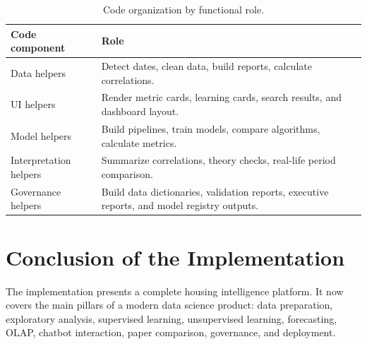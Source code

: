 \begin{table}[H]
\centering
\begin{tabularx}{\textwidth}{lX}
\toprule
\textbf{Code component} & \textbf{Role} \\
\midrule
Data helpers & Detect dates, clean data, build reports, calculate correlations. \\
UI helpers & Render metric cards, learning cards, search results, and dashboard layout. \\
Model helpers & Build pipelines, train models, compare algorithms, calculate metrics. \\
Interpretation helpers & Summarize correlations, theory checks, real-life period comparison. \\
Governance helpers & Build data dictionaries, validation reports, executive reports, and model registry outputs. \\
\bottomrule
\end{tabularx}
\caption{Code organization by functional role.}
\end{table}

\section{Conclusion of the Implementation}

The implementation presents a complete housing intelligence platform. It now covers the main pillars of a modern data science product: data preparation, exploratory analysis, supervised learning, unsupervised learning, forecasting, OLAP, chatbot interaction, paper comparison, governance, and deployment.

